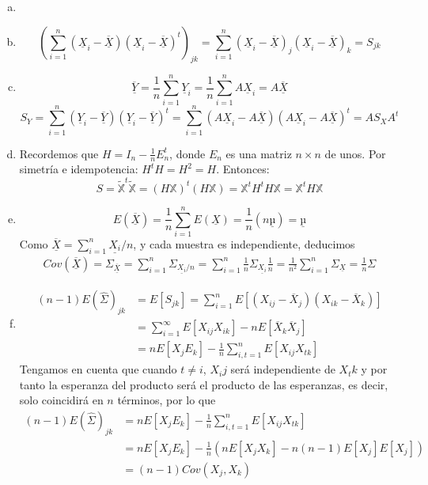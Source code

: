 \documentclass[twoside]{article}
\newcommand{\media}[1]{{\overline{#1}}}
\newcommand{\muestra}[1]{{\underline{#1}}}
\newcommand{\m}[1]{{\muestra{#1}}}
\newcommand{\mX}{{\muestra{X}}}
\begin{document}
\begin{solucion}
\begin{enumerate}[(a)]
\item[]
\item
\[ \left(\sum_{i=1}^n (\mX_i-\media{\m{X}})(\mX_i-\media{\m{X}})^t\right)_{jk} = \sum_{i=1}^n (\mX_i-\media{\m{X}})_j(\mX_i-\media{\m{X}})_k = S_{jk} \]
\item
\[ \media{\m{Y}} = \frac{1}{n} \sum_{i=1}^n \m{Y}_i = \frac{1}{n} \sum_{i=1}^n A\m{X}_i = A \media{\mX} \]
\[ S_Y = \sum_{i=1}^n (\m{Y}_i-\media{\m{Y}})(\m{Y}_i-\media{\m{Y}})^t = \sum_{i=1}^n (A\mX_i-A\media{\mX})(A\mX_i-A\media{\mX})^t = A S_X A^t\]
\item Recordemos que $H = I_n - \frac{1}{n}E_n^t$, donde $E_n$ es una matriz $n \times n$ de unos. 
Por simetría e idempotencia: $H^t H = H^2 = H$. Entonces:
\[ S = \tilde{\mathbb{X}}^t\tilde{\mathbb{X}} = (H \mathbb{X})^t (H \mathbb{X}) = \mathbb{X}^t H^t H \mathbb{X} = \mathbb{X}^t H \mathbb{X} \]
\item
\[ E(\media{\mX}) = \frac{1}{n}\sum_{i=1}^n E(\mX) = \frac{1}{n} (n \m{µ}) = \m{µ} \]
Como $\media{\mX}= \sum_{i=1}^n \muestra{X_i}/n$, y cada muestra es independiente, deducimos 
\begin{gather*}
 Cov(\media{\mX}) = \Sigma_{\media{\mX}}=\sum_{i=1}^n\Sigma_{\muestra{X_i}/n} = \sum_{i=1}^n\frac{1}{n} \Sigma_{\muestra{X_i}} \frac{1}{n} = \frac{1}{n^2}\sum_{i=1}^n \Sigma_{\muestra{X}}= \frac{1}{n}\Sigma
\end{gather*}
\item 
\begin{align*} 
(n-1)E(\hat{Σ})_{jk} &= E[S_{jk}] = \sum_{i=1}^n E\left[(X_{ij}-\media{X}_j)(X_{ik}-\media{X}_k)\right]\\
&=\sum_{i=1}^\infty E\left[ X_{ij}X_{ik}\right]-nE[\media{X}_k\media{X}_j]\\
&=nE[X_jE_k]-\frac{1}{n}\sum_{i,t=1}^nE[X_{ij}X_{tk}]
\end{align*}
Tengamos en cuenta que cuando $t\neq i$, $X_ij$ será independiente de $X_tk$ y por tanto la esperanza del producto será el producto de las esperanzas, es decir, solo coincidirá en $n$ términos, por lo que
\begin{align*} 
(n-1)E(\hat{Σ})_{jk} &=nE[X_jE_k]-\frac{1}{n}\sum_{i,t=1}^nE[X_{ij}X_{tk}]\\
&=nE[X_jE_k]-\frac{1}{n}(nE[X_jX_k]-n(n-1)E[X_j]E[X_j])\\
&= (n-1)Cov(X_j,X_k)
\end{align*}
\end{enumerate}

\end{solucion}
\end{document}
